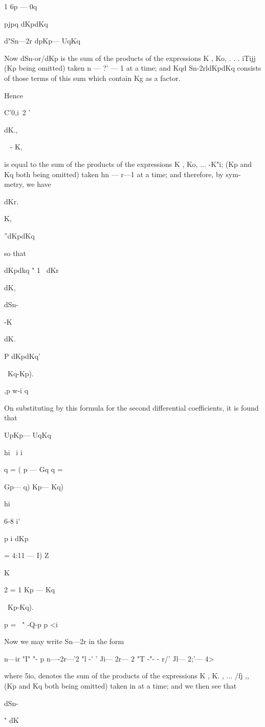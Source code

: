 {1 6p — 0q

pjpq dKpdKq

d"Sn—2r dpKp— UqKq


Now dSn-or/dKp is the sum of the products of the expressions K , Ko, .
. . iTijj (Kp being omitted) taken n — ?' — 1 at a time; and Kqd
Sn-2rldKpdKq consists of those terms of this sum which contain Kg as a
factor.

Hence

C'0,i\ 2 '

dK.,

~ - K,

is equal to the sum of the products of the expressions K , Ko, ...
-K"i; (Kp and Kq both being omitted) taken hn — r—1 at a time; and
therefore, by sym- metry, we have

dKr.

K,

''dKpdKq

so that

dKpdkq " 1 ~dKr

dK,

dSn-

-K

dK.

P dKpdKq'

\ Kq-Kp).

,p w-i q

On substituting by this formula for the second differential
coefficients, it is found that

UpKp— UqKq

hi \ i i

  q = ( p — Gq q = \ \ {Gp— q) Kp— Kq)\

hi

6-8 i'

p i dKp

= 4:11 — I) Z

K

2 = 1 Kp — Kq\

\ Kp-Kq).

p = \ " -Q-p p <i

Now we may write Sn—2r in the form

 n—ir "I" "- p n—-2r—'2 "l -' ' Ji— 2r— 2 "T -"- - r/' Jl— 2;'— 4>

where 5io, denotes the sum of the products of the expressions K , K. ,
... /fj ,, (Kp and Kq both being omitted) taken in at a time; and we
then see that

dSn-

" dK

}}
